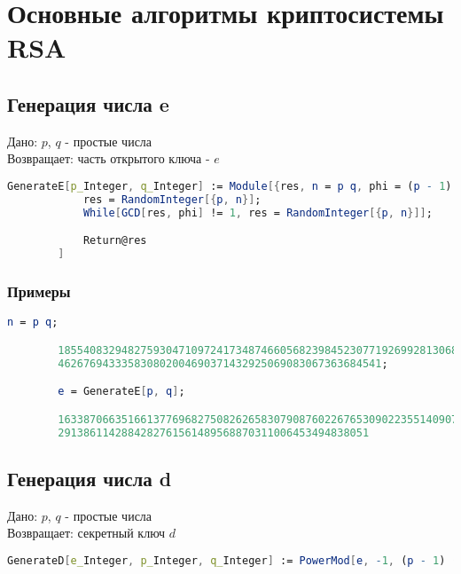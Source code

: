 
\chapter{Основные алгоритмы криптосистемы RSA}

	\section{Генерация числа e}
		Дано: $p$, $q$ - простые числа \\
		Возвращает: часть открытого ключа - $e$

		\begin{lstlisting}[language=Mathematica,caption={
      		Генерация числа e	
    	}]
		GenerateE[p_Integer, q_Integer] := Module[{res, n = p q, phi = (p - 1) (q - 1)}, 
			res = RandomInteger[{p, n}]; 
			While[GCD[res, phi] != 1, res = RandomInteger[{p, n}]];

			Return@res
		]
    	\end{lstlisting}

    	\subsection{Примеры}

    	\begin{lstlisting}[language=Mathematica,caption={
      		Пример	
    	}]
		n = p q;

		185540832948275930471097241734874660568239845230771926992813068239006\
		462676943335830802004690371432925069083067363684541;

		e = GenerateE[p, q];

		1633870663516613776968275082626583079087602267653090223551409078842007\
		2913861142884282761561489568870311006453494838051
    	\end{lstlisting}

	\section{Генерация числа d}
		Дано: $p$, $q$ - простые числа \\
		Возвращает: секретный ключ $d$

		\begin{lstlisting}[language=Mathematica,caption={
      		Генерация числа d	
    	}]
    	GenerateD[e_Integer, p_Integer, q_Integer] := PowerMod[e, -1, (p - 1) (q - 1)]
    	\end{lstlisting}

